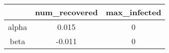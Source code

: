 \begin{tabular}{|c|c|c|}
\hline
& num_recovered & max_infected \\
\hline
alpha & 0.015 & 0 \\
\hline
beta & -0.011 & 0 \\
\hline
\end{tabular}
